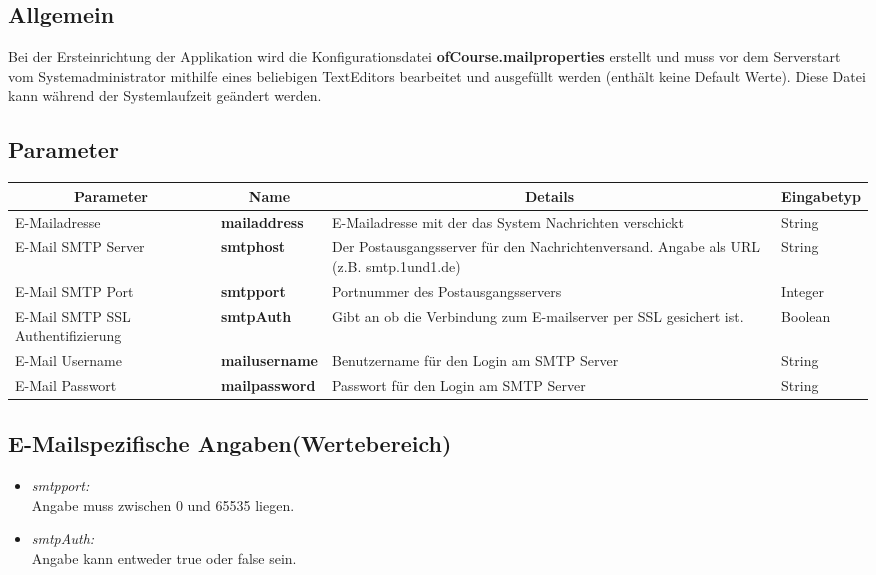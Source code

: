 \subsection{Allgemein}
Bei der Ersteinrichtung der Applikation wird die Konfigurationsdatei \textbf{ofCourse.mailproperties} erstellt und muss vor dem Serverstart vom Systemadministrator mithilfe eines beliebigen TextEditors bearbeitet und ausgefüllt werden (enthält keine Default Werte). Diese Datei kann während der Systemlaufzeit geändert werden.

\subsection{Parameter}
\begin{center}
	\begin{longtable}{|p{4cm} | p{3cm}| p{7cm} | p{2cm} |}
		\hline
		\multicolumn{1}{|c|}{\textbf{Parameter}} & \multicolumn{1}{c|}{\textbf{Name}} & \multicolumn{1}{c|}{\textbf{Details}} & \multicolumn{1}{c|}{\textbf{Eingabetyp}}
		\\ \hline
		E-Mailadresse & \textbf{mailaddress} & E-Mailadresse mit der das System Nachrichten verschickt & String \\ \hline
		E-Mail SMTP Server & \textbf{smtphost} & Der Postausgangsserver für den Nachrichtenversand. Angabe als URL (z.B. smtp.1und1.de) & String \\ \hline
		E-Mail SMTP Port & \textbf{smtpport} & Portnummer des Postausgangsservers & Integer \\ \hline
		E-Mail SMTP SSL Authentifizierung & \textbf{smtpAuth} & Gibt an ob die Verbindung zum E-mailserver per SSL gesichert ist. & Boolean  \\ \hline
		E-Mail Username & \textbf{mailusername} & Benutzername für den Login am SMTP Server & String \\ \hline
		E-Mail Passwort & \textbf{mailpassword} & Passwort für den Login am SMTP Server & String \\ \hline
		
	\end{longtable}
\end{center}
\subsection{E-Mailspezifische Angaben(Wertebereich)}

\begin{itemize}
	\item \emph{smtpport:}\\
	Angabe muss zwischen 0 und 65535 liegen.
	\item \emph{smtpAuth:}\\
	Angabe kann entweder true oder false sein.
\end{itemize}


